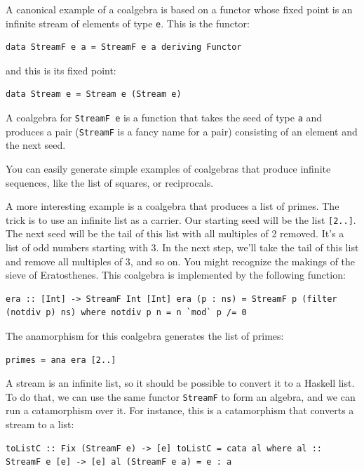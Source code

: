 A canonical example of a coalgebra is based on a functor whose fixed
point is an infinite stream of elements of type \texttt{e}. This is the
functor:

\begin{verbatim}
data StreamF e a = StreamF e a deriving Functor
\end{verbatim}

and this is its fixed point:

\begin{verbatim}
data Stream e = Stream e (Stream e)
\end{verbatim}

A coalgebra for \texttt{StreamF\ e} is a function that takes the seed of
type \texttt{a} and produces a pair (\texttt{StreamF} is a fancy name
for a pair) consisting of an element and the next seed.

You can easily generate simple examples of coalgebras that produce
infinite sequences, like the list of squares, or reciprocals.

A more interesting example is a coalgebra that produces a list of
primes. The trick is to use an infinite list as a carrier. Our starting
seed will be the list \texttt{{[}2..{]}}. The next seed will be the tail
of this list with all multiples of 2 removed. It's a list of odd numbers
starting with 3. In the next step, we'll take the tail of this list and
remove all multiples of 3, and so on. You might recognize the makings of
the sieve of Eratosthenes. This coalgebra is implemented by the
following function:

\begin{verbatim}
era :: [Int] -> StreamF Int [Int] era (p : ns) = StreamF p (filter (notdiv p) ns) where notdiv p n = n `mod` p /= 0
\end{verbatim}

The anamorphism for this coalgebra generates the list of primes:

\begin{verbatim}
primes = ana era [2..]
\end{verbatim}

A stream is an infinite list, so it should be possible to convert it to
a Haskell list. To do that, we can use the same functor \texttt{StreamF}
to form an algebra, and we can run a catamorphism over it. For instance,
this is a catamorphism that converts a stream to a list:

\begin{verbatim}
toListC :: Fix (StreamF e) -> [e] toListC = cata al where al :: StreamF e [e] -> [e] al (StreamF e a) = e : a
\end{verbatim}

